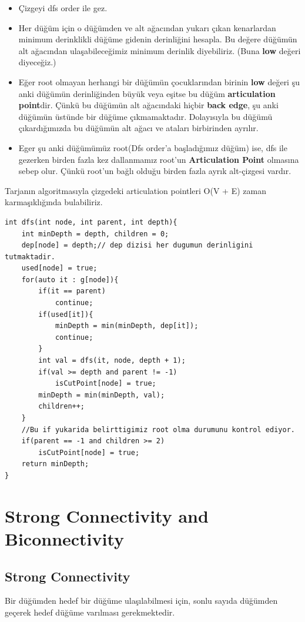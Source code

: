 \documentclass[12pt]{article}
\begin{document}
\begin{itemize}
	\item Çizgeyi dfs order ile gez.
	\item Her düğüm için o düğümden ve alt ağacından yukarı çıkan kenarlardan minimum derinklikli düğüme gidenin derinliğini hesapla. Bu değere düğümün alt ağacından ulaşabileceğimiz minimum derinlik diyebiliriz. (Buna \textbf{low} değeri diyeceğiz.)
	\item Eğer root olmayan herhangi bir düğümün çocuklarından birinin \textbf{low} değeri şu anki düğümün derinliğinden büyük veya eşitse bu düğüm \textbf{articulation point}dir. Çünkü bu düğümün alt ağacındaki hiçbir \textbf{back edge}, şu anki düğümün üstünde bir düğüme çıkmamaktadır. Dolayısıyla bu düğümü çıkardığımızda bu düğümün alt ağacı ve ataları birbirinden ayrılır.
	\item Eger şu anki düğümümüz root(Dfs order'a başladığımız düğüm) ise, dfs ile gezerken birden fazla kez dallanmamız root'un \textbf{Articulation Point} olmasına sebep olur. Çünkü root'un bağlı olduğu birden fazla ayrık alt-çizgesi vardır.
\end{itemize}

Tarjanın algoritmasıyla çizgedeki articulation pointleri O(V + E) zaman karmaşıklığında bulabiliriz.

\cleardoublepage

    \begin{verbatim}
int dfs(int node, int parent, int depth){
	int minDepth = depth, children = 0;
	dep[node] = depth;// dep dizisi her dugumun derinligini tutmaktadir.
	used[node] = true;
	for(auto it : g[node]){
		if(it == parent)
			continue;
		if(used[it]){
			minDepth = min(minDepth, dep[it]);
			continue;
		}
		int val = dfs(it, node, depth + 1);
		if(val >= depth and parent != -1)
			isCutPoint[node] = true;
		minDepth = min(minDepth, val);
		children++;
	}
	//Bu if yukarida belirttigimiz root olma durumunu kontrol ediyor.
	if(parent == -1 and children >= 2)
		isCutPoint[node] = true;
	return minDepth;
}
    \end{verbatim}
    
    
    \cleardoublepage
	
	
	\section{Strong Connectivity and Biconnectivity}
	
	\subsection{Strong Connectivity}
	 Bir düğümden hedef bir düğüme ulaşılabilmesi için, sonlu sayıda düğümden geçerek hedef düğüme varılması gerekmektedir.
	
\end{document}

